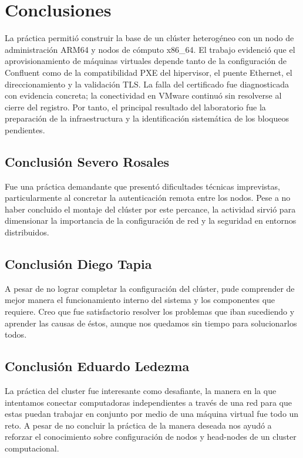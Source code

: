 \documentclass[12pt,a4paper]{article}
\begin{document}
\section{Conclusiones}
La práctica permitió construir la base de un clúster heterogéneo con un nodo de administración ARM64 y nodos de cómputo x86\_64. El trabajo evidenció que el aprovisionamiento de máquinas virtuales depende tanto de la configuración de Confluent como de la compatibilidad PXE del hipervisor, el puente Ethernet, el direccionamiento y la validación TLS. La falla del certificado fue diagnosticada con evidencia concreta; la conectividad en VMware continuó sin resolverse al cierre del registro. Por tanto, el principal resultado del laboratorio fue la preparación de la infraestructura y la identificación sistemática de los bloqueos pendientes.

\subsection{Conclusión Severo Rosales}
Fue una práctica demandante que presentó dificultades técnicas imprevistas, particularmente al concretar la autenticación remota entre los nodos. Pese a no haber concluido el montaje del clúster por este percance, la actividad sirvió para dimensionar la importancia de la configuración de red y la seguridad en entornos distribuidos.

\subsection{Conclusión Diego Tapia}
A pesar de no lograr completar la configuración del clúster, pude comprender de mejor manera el funcionamiento interno del sistema y los componentes que requiere. Creo que fue satisfactorio resolver los problemas que iban sucediendo y aprender las causas de éstos, aunque nos quedamos sin tiempo para solucionarlos todos.

\subsection{Conclusión Eduardo Ledezma}
La práctica del cluster fue interesante como desafiante, la manera en la que intentamos conectar computadoras independientes a través de una red para que estas puedan trabajar en conjunto por medio de una máquina virtual fue todo un reto. A pesar de no concluir la práctica de la manera deseada nos ayudó a reforzar el conocimiento sobre configuración de nodos y head-nodes de un cluster computacional.
\end{document}
